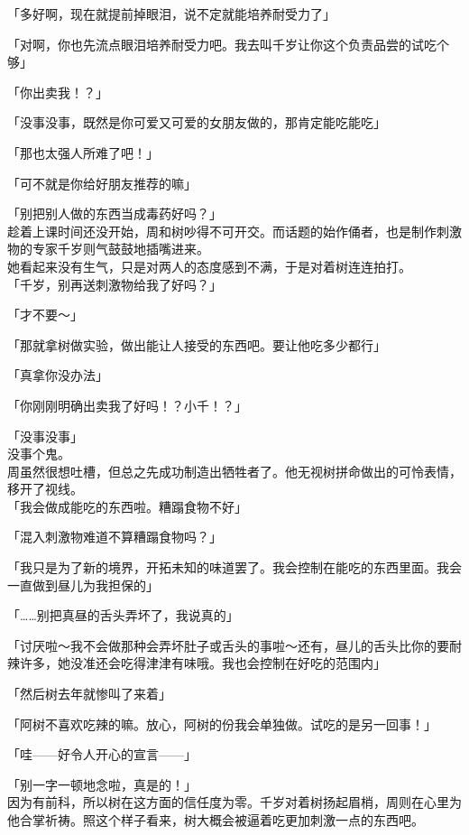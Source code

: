「多好啊，现在就提前掉眼泪，说不定就能培养耐受力了」

「对啊，你也先流点眼泪培养耐受力吧。我去叫千岁让你这个负责品尝的试吃个够」

「你出卖我！？」

「没事没事，既然是你可爱又可爱的女朋友做的，那肯定能吃能吃」

「那也太强人所难了吧！」

「可不就是你给好朋友推荐的嘛」

「别把别人做的东西当成毒药好吗？」\\

趁着上课时间还没开始，周和树吵得不可开交。而话题的始作俑者，也是制作刺激物的专家千岁则气鼓鼓地插嘴进来。\\

她看起来没有生气，只是对两人的态度感到不满，于是对着树连连拍打。\\

「千岁，别再送刺激物给我了好吗？」

「才不要～」

「那就拿树做实验，做出能让人接受的东西吧。要让他吃多少都行」

「真拿你没办法」

「你刚刚明确出卖我了好吗！？小千！？」

「没事没事」\\

没事个鬼。\\

周虽然很想吐槽，但总之先成功制造出牺牲者了。他无视树拼命做出的可怜表情，移开了视线。\\

「我会做成能吃的东西啦。糟蹋食物不好」

「混入刺激物难道不算糟蹋食物吗？」

「我只是为了新的境界，开拓未知的味道罢了。我会控制在能吃的东西里面。我会一直做到昼儿为我担保的」

「……别把真昼的舌头弄坏了，我说真的」

「讨厌啦～我不会做那种会弄坏肚子或舌头的事啦～还有，昼儿的舌头比你的要耐辣许多，她没准还会吃得津津有味哦。我也会控制在好吃的范围内」

「然后树去年就惨叫了来着」

「阿树不喜欢吃辣的嘛。放心，阿树的份我会单独做。试吃的是另一回事！」

「哇——好令人开心的宣言——」

「别一字一顿地念啦，真是的！」\\

因为有前科，所以树在这方面的信任度为零。千岁对着树扬起眉梢，周则在心里为他合掌祈祷。照这个样子看来，树大概会被逼着吃更加刺激一点的东西吧。\\

